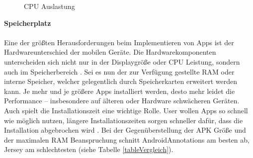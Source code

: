 \begin{figure} [ht]
	\centering
	 \qquad
	 \qquad
	 \qquad
	\caption{CPU Auslastung} 
	\label{cpuAuslastung}
\end{figure} 

{\large \textbf{Speicherplatz}}\\\\
Eine der größten Herausforderungen beim Implementieren von Apps ist der Hardwareunterschied der mobilen Geräte. Die Hardwarekomponenten unterscheiden sich nicht nur in der Displaygröße oder CPU Leistung, sondern auch im Speicherbereich \cite{joorabchi:challenges}. Sei es nun der zur Verfügung gestellte \acrfull{RAM} oder interne Speicher, welcher gelegentlich durch Speicherkarten erweitert werden kann. Je mehr und je größere Apps installiert werden, desto mehr leidet die Performance – insbesondere auf älteren oder Hardware schwächeren Geräten. Auch spielt die Installationszeit eine wichtige Rolle. User wollen Apps so schnell wie möglich nutzen, längere Installationszeiten sorgen schneller dafür, dass die Installation abgebrochen wird \cite{schaefers:apk}. Bei der Gegenüberstellung der APK Größe und der maximalen RAM Beanspruchung schnitt AndroidAnnotations am besten ab, Jersey am schlechtesten (siehe Tabelle \ref{tableVergleich}). 

